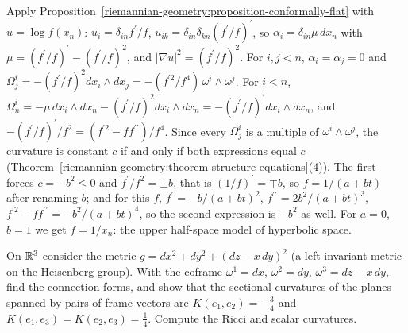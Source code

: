 \begin{solution}
Apply Proposition~\ref{riemannian-geometry:proposition-conformally-flat} with $u = \log f(x_n)$: $u_i = \delta_{in}f^{\prime}/f$, $u_{ik} = \delta_{in}\delta_{kn}(f^{\prime}/f)^{\prime}$, so
$\alpha_i = \delta_{in}\mu\,dx_n$ with $\mu = (f^{\prime}/f)^{\prime} - (f^{\prime}/f)^2$, and $|\nabla u|^2 = (f^{\prime}/f)^2$. For $i, j < n$, $\alpha_i = \alpha_j = 0$ and
$\Omega^i_j = -(f^{\prime}/f)^2dx_i \wedge dx_j = -(f^{\prime2}/f^4)\,\omega^i \wedge \omega^j$. For $i < n$, $\Omega^i_n = -\mu\,dx_i \wedge dx_n - (f^{\prime}/f)^2dx_i \wedge dx_n = -(f^{\prime}/f)^{\prime}dx_i \wedge dx_n$, and
$-(f^{\prime}/f)^{\prime}/f^2 = (f^{\prime2} - ff^{\prime\prime})/f^4$. Since every $\Omega^i_j$ is a multiple of $\omega^i \wedge \omega^j$, the curvature is constant $c$ if and only if both expressions equal
$c$ (Theorem~\ref{riemannian-geometry:theorem-structure-equations}(4)). The first forces $c = -b^2 \leq 0$ and $f^{\prime}/f^2 = \pm b$, that is $(1/f)^{\prime} = \mp b$, so $f = 1/(a + bt)$ after renaming
$b$; and for this $f$, $f^{\prime} = -b/(a + bt)^2$, $f^{\prime\prime} = 2b^2/(a + bt)^3$, $f^{\prime2} - ff^{\prime\prime} = -b^2/(a + bt)^4$, so the second expression is $-b^2$ as well. For $a = 0$, $b = 1$ we get
$f = 1/x_n$: the upper half-space model of hyperbolic space.
\end{solution}

\begin{exercise}\label{riemannian-geometry:exercise-heisenberg}
On $\mathbb{R}^3$ consider the metric $g = dx^2 + dy^2 + (dz - x\,dy)^2$ (a left-invariant metric on the Heisenberg group). With the coframe $\omega^1 = dx$, $\omega^2 = dy$, $\omega^3 = dz - x\,dy$, find the
connection forms, and show that the sectional curvatures of the planes spanned by pairs of frame vectors are $K(e_1, e_2) = -\frac34$ and $K(e_1, e_3) = K(e_2, e_3) = \frac14$. Compute the Ricci and
scalar curvatures.
\end{exercise}

